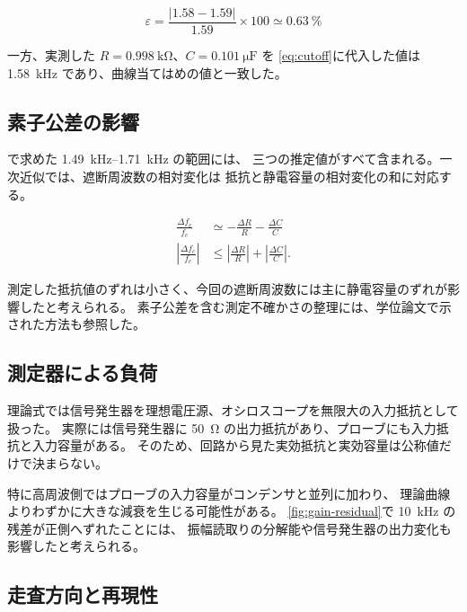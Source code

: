 \begin{equation}
  \varepsilon
  =\frac{\lvert 1.58-1.59\rvert}{1.59}\times100
  \simeq\qty{0.63}{\percent}
  \label{eq:relative-error}
\end{equation}

一方、実測した $R=\qty{0.998}{\kilo\ohm}$、$C=\qty{0.101}{\micro\farad}$ を
\cref{eq:cutoff}に代入した値は \qty{1.58}{\kilo\hertz} であり、曲線当てはめの値と一致した。

\subsection{素子公差の影響}
\label{subsec:tolerance-discussion}

で求めた \qtyrange{1.49}{1.71}{\kilo\hertz} の範囲には、
三つの推定値がすべて含まれる。一次近似では、遮断周波数の相対変化は
抵抗と静電容量の相対変化の和に対応する。

\begin{align}
  \frac{\Delta f_c}{f_c}
    &\simeq-\frac{\Delta R}{R}-\frac{\Delta C}{C}
      \label{eq:tolerance-propagation}\\
  \left\lvert\frac{\Delta f_c}{f_c}\right\rvert
    &\leq
      \left\lvert\frac{\Delta R}{R}\right\rvert
      +\left\lvert\frac{\Delta C}{C}\right\rvert.
      \label{eq:tolerance-bound}
\end{align}

測定した抵抗値のずれは小さく、今回の遮断周波数には主に静電容量のずれが影響したと考えられる。
素子公差を含む測定不確かさの整理には、学位論文で示された方法も参照した\cite{jp-thesis}。

\subsection{測定器による負荷}
\label{subsec:instrument-loading}

理論式では信号発生器を理想電圧源、オシロスコープを無限大の入力抵抗として扱った。
実際には信号発生器に \qty{50}{\ohm} の出力抵抗があり、プローブにも入力抵抗と入力容量がある。
そのため、回路から見た実効抵抗と実効容量は公称値だけで決まらない。

特に高周波側ではプローブの入力容量がコンデンサと並列に加わり、
理論曲線よりわずかに大きな減衰を生じる可能性がある。
\cref{fig:gain-residual}で \qty{10}{\kilo\hertz} の残差が正側へずれたことには、
振幅読取りの分解能や信号発生器の出力変化も影響したと考えられる。

\subsection{走査方向と再現性}
\label{subsec:sweep-direction}

